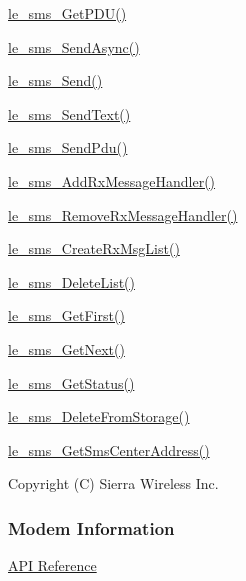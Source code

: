 \begin{DoxyItemize}
\item \hyperlink{le__sms__interface_8h_a77555788d56f73fa52f56904cd39cd2f}{le\+\_\+sms\+\_\+\+Get\+P\+D\+U()}
\item \hyperlink{le__sms__interface_8h_a0ba61dcf10157e9982702373577c6b45}{le\+\_\+sms\+\_\+\+Send\+Async()}
\item \hyperlink{le__sms__interface_8h_ab7dee7d2c74cfcadd9ea0d5fe1786dfc}{le\+\_\+sms\+\_\+\+Send()}
\item \hyperlink{le__sms__interface_8h_a275932e7f318db06cd1d1cbc8e3f573f}{le\+\_\+sms\+\_\+\+Send\+Text()}
\item \hyperlink{le__sms__interface_8h_a6c45951342396e9c4bc0e995b4e70784}{le\+\_\+sms\+\_\+\+Send\+Pdu()}
\item \hyperlink{le__sms__interface_8h_a844d595f3ae8d170b2fff80d854abb8d}{le\+\_\+sms\+\_\+\+Add\+Rx\+Message\+Handler()}
\item \hyperlink{le__sms__interface_8h_a469a4d08b9ccb8b61ed7b8294e6ee3ef}{le\+\_\+sms\+\_\+\+Remove\+Rx\+Message\+Handler()}
\item \hyperlink{le__sms__interface_8h_aee4328f9e417108fa16794cc135073d0}{le\+\_\+sms\+\_\+\+Create\+Rx\+Msg\+List()}
\item \hyperlink{le__sms__interface_8h_a4027c05c4ee7552ab0e081caa315c8a2}{le\+\_\+sms\+\_\+\+Delete\+List()}
\item \hyperlink{le__sms__interface_8h_a934253dee33a6090656876cff853b2c6}{le\+\_\+sms\+\_\+\+Get\+First()}
\item \hyperlink{le__sms__interface_8h_ac3b6a30a6d4e4f21749b536184b836ec}{le\+\_\+sms\+\_\+\+Get\+Next()}
\item \hyperlink{le__sms__interface_8h_ae1843c72eca77cd6da94cb686e5c2ae8}{le\+\_\+sms\+\_\+\+Get\+Status()}
\item \hyperlink{le__sms__interface_8h_aff755186b683b94ba2788b48e28284a3}{le\+\_\+sms\+\_\+\+Delete\+From\+Storage()}
\item \hyperlink{le__sms__interface_8h_ae46b8ea579c788950049948edf1110b6}{le\+\_\+sms\+\_\+\+Get\+Sms\+Center\+Address()}
\end{DoxyItemize}





Copyright (C) Sierra Wireless Inc. \hypertarget{c_info}{}\subsubsection{Modem Information}\label{c_info}
\hyperlink{le__info__interface_8h}{A\+PI Reference}





